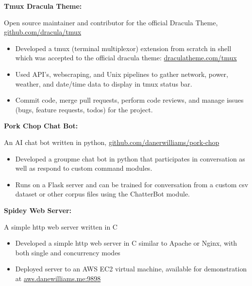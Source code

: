 \documentclass[letterpaper,10pt]{article}
\newcommand{\resumeItem}[2]{
  \item\small{
    {#1}{#2 \vspace{-2pt}}
  }
}
\newcommand{\resumeSubItem}[2]{\resumeItem{#1}{#2}\vspace{-4pt}}
\begin{document}
{      \resumeSubItem{\textbf{Tmux Dracula Theme: }}
      { Open source maintainer and contributor for the official Dracula Theme, \href{https://github.com/dracula/tmux}{github.com/dracula/tmux}
         \vspace{-5pt}
         \begin{itemize}
          \item Developed a tmux (terminal multiplexor) extension from scratch in shell which was accepted to the official dracula theme: \href{https://draculatheme.com/tmux}{draculatheme.com/tmux}
          \vspace{-2pt}
          \item Used API's, webscraping, and Unix pipelines to gather network, power, weather, and date/time data to display in tmux status bar.
          \vspace{-2pt}
          \item Commit code, merge pull requests, perform code reviews, and manage issues (bugs, feature requests, todos) for the project.
         \end{itemize}
      }
     \vspace{-2pt}
      \resumeSubItem{\textbf{Pork Chop Chat Bot: }}
     { An AI chat bot written in python, \href{https://github.com/danerwilliams/pork-chop}{github.com/danerwilliams/pork-chop}
        \vspace{-5pt}
        \begin{itemize}
            \item Developed a groupme chat bot in python that participates in conversation as well as respond to custom command modules.
            \vspace{-2pt}
            \item Runs on a Flask server and can be trained for conversation from a custom csv dataset or other corpus files using the ChatterBot module. 
        \end{itemize}
     }
    \vspace{-2pt}
    \resumeSubItem{\textbf{Spidey Web Server: }}
      { A simple http web server written in C
        \vspace{-5pt}
        \begin{itemize}
            \item Developed a simple http web server in C similar to Apache or Nginx, with both single and concurrency modes
            \vspace{-2pt}
            \item Deployed server to an AWS EC2 virtual machine, available for demonstration at \href{http://aws.danewilliams.me:9898}{aws.danewilliams.me:9898}
        \end{itemize}
      }

}
\end{document}

